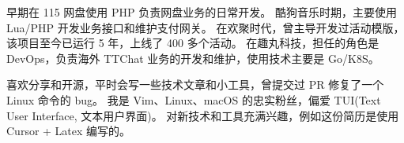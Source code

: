 
\begin{cvparagraph}

早期在 115 网盘使用 PHP 负责网盘业务的日常开发。
酷狗音乐时期，主要使用 Lua/PHP 开发业务接口和维护支付网关。
在欢聚时代，曾主导开发过活动模版，该项目至今已运行 5 年，上线了 400 多个活动。
在趣丸科技，担任的角色是 DevOps，负责海外 TTChat 业务的开发和维护，使用技术主要是 Go/K8S。

喜欢分享和开源，平时会写一些技术文章和小工具，曾提交过 PR 修复了一个 Linux 命令的 bug。
我是 Vim、Linux、macOS 的忠实粉丝，偏爱 TUI(Text User Interface, 文本用户界面)。
对新技术和工具充满兴趣，例如这份简历是使用 Cursor + Latex 编写的。
\end{cvparagraph}
